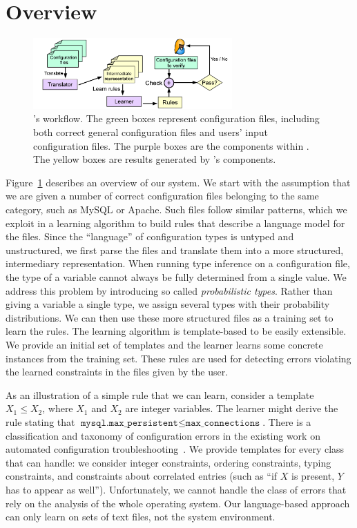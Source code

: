 
\section{\app Overview}

\begin{figure}[tbp] \centering
\includegraphics[width=0.68\textwidth]{figs/overview}
\caption{\app's workflow. The green boxes represent configuration files,
  including both correct general configuration files and users' input
  configuration files. The purple boxes are the components within \app.
  The yellow boxes are results generated by \app's components.}
\label{fig-overview}
\end{figure}

Figure~\ref{fig-overview} describes an overview of our system. We start
with the assumption that we are given a number of correct configuration
files belonging to the same category, such as MySQL or Apache. 
Such files follow similar patterns, which we exploit
in a learning algorithm to build rules that
describe a language model for the files. Since the
``language'' of configuration types is untyped and unstructured, we
first parse the files and translate them into a more structured,
intermediary representation.
When running type inference on a configuration file, 
the type of a variable cannot always be fully determined from 
a single value.
We address this problem 
by introducing so called {\emph{probabilistic types}}.
Rather than giving a variable a single type, we assign several types with their probability distributions. 
We can then use these more structured files
as a training set to learn the rules. The learning algorithm
is template-based to be easily extensible. We provide an initial set of templates and the
learner learns some concrete instances from the training set. These
rules are used for detecting errors violating the learned constraints
in the files given by the user.

As an 
illustration of a simple rule that we can learn, consider a template
 $X_1 \le X_2$, where $X_1$ and $X_2$ are
integer variables. The learner might derive the rule stating that
$\texttt{mysql.max\_persistent} \le \texttt{max\_connections}$. There is a classification and taxonomy of configuration errors in the 
existing work on automated configuration troubleshooting~\cite{yin11anempirical, configdataset}. We provide templates for every class that \app can handle: we consider integer constraints, ordering
constraints, typing constraints, and constraints about correlated entries (such as ``if $X$ is present, $Y$ has to appear as well''). 
Unfortunately, we cannot handle the class of errors that rely on the analysis of the whole operating system.
Our language-based approach can only learn on sets of text files, not the system environment.



